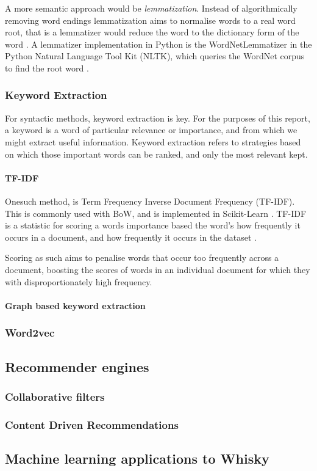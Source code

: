 A more semantic approach would be \emph{lemmatization}. Instead of algorithmically removing word endings lemmatization 
aims to normalise words to a real word root, that is a lemmatizer would reduce the word to the dictionary
form of the word \cite{Jayakodi2016}.  A lemmatizer implementation in Python is the WordNetLemmatizer in the Python 
Natural Language Tool Kit (NLTK), which queries the WordNet corpus to find the root word 
\cite{StevenBirdEwanKlein2009, princetonuniversity_2010}. 
 
\subsubsection{Keyword Extraction}\label{sssec:kwe}
For syntactic methods, keyword extraction is key.  For the purposes of this report, a keyword is a word of particular
relevance or importance, and from which we might extract useful information.  Keyword extraction refers to strategies
based on which those important words can be ranked, and only the most relevant kept.

\paragraph{TF-IDF}\label{ssec:tfidf}

Onesuch method, is Term Frequency Inverse Document Frequency (TF-IDF). This is commonly used with BoW, and is 
implemented in Scikit-Learn \cite{Barupal2011}.  TF-IDF is a statistic for scoring a words importance based the word's
how frequently it occurs in a document, and how frequently it occurs in the dataset \cite{Ramos2003}.

Scoring as such aims to penalise words that occur too frequently across a document, boosting the scores of words in an 
individual document for which they with disproportionately high frequency.

\paragraph{Graph based keyword extraction}\label{sssec:gbkwe}

\subsubsection{Word2vec}\label{ssec:w2v}
\subsection{Recommender engines}\label{ssec:recommenders}
\subsubsection{Collaborative filters}\label{sssec:collab}
\subsubsection{Content Driven Recommendations}\label{sssec:content}

\subsection{Machine learning applications to Whisky}\label{ssec:ml2whisk}


